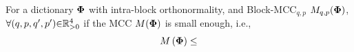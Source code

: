 \begin{property}
\label{prp:DontKnow1} %
For a dictionary $\boldsymbol{\Phi}$ with intra-block orthonormality, and Block-MCC$_{q,p}$ $M_{q,p}(\boldsymbol{\Phi})$, $\forall (q , p , q' , p') {\in} \mathbb{R}^4_{{>} 0}$ if the MCC $M(\boldsymbol{\Phi})$ is small enough, i.e., 
\begin{gather*}
\begin{aligned}
M\myparanthese{\myPhi} \leq

\end{aligned}
\end{gather*}
\end{property}
